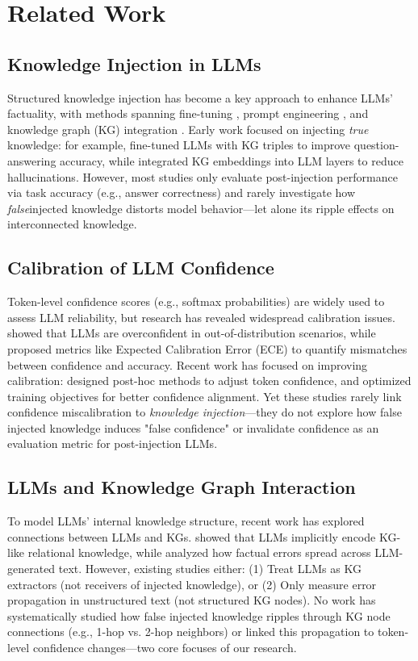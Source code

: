 \section{Related Work}

\subsection{Knowledge Injection in LLMs}
Structured knowledge injection has become a key approach to enhance LLMs' factuality, with methods spanning fine-tuning \cite{cite}, prompt engineering \cite{cite}, and knowledge graph (KG) integration \cite{cite}. Early work focused on injecting \emph{true} knowledge: for example, \citet{cite} fine-tuned LLMs with KG triples to improve question-answering accuracy, while \citet{cite} integrated KG embeddings into LLM layers to reduce hallucinations. However, most studies only evaluate post-injection performance via task accuracy (e.g., answer correctness) and rarely investigate how \emph{false}injected knowledge distorts model behavior—let alone its ripple effects on interconnected knowledge.

\subsection{Calibration of LLM Confidence}
Token-level confidence scores (e.g., softmax probabilities) are widely used to assess LLM reliability, but research has revealed widespread calibration issues. \citet{cite} showed that LLMs are overconfident in out-of-distribution scenarios, while \citet{cite} proposed metrics like Expected Calibration Error (ECE) to quantify mismatches between confidence and accuracy. Recent work has focused on improving calibration: \citet{cite} designed post-hoc methods to adjust token confidence, and \citet{cite} optimized training objectives for better confidence alignment. Yet these studies rarely link confidence miscalibration to \emph{knowledge injection}—they do not explore how false injected knowledge induces "false confidence" or invalidate confidence as an evaluation metric for post-injection LLMs.

\subsection{LLMs and Knowledge Graph Interaction}
To model LLMs' internal knowledge structure, recent work has explored connections between LLMs and KGs. \citet{cite} showed that LLMs implicitly encode KG-like relational knowledge, while \citet{cite} analyzed how factual errors spread across LLM-generated text. However, existing studies either: (1) Treat LLMs as KG extractors (not receivers of injected knowledge), or (2) Only measure error propagation in unstructured text (not structured KG nodes). No work has systematically studied how false injected knowledge ripples through KG node connections (e.g., 1-hop vs. 2-hop neighbors) or linked this propagation to token-level confidence changes—two core focuses of our research.
